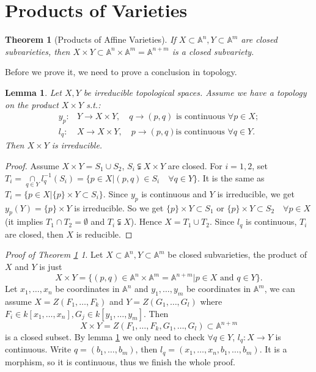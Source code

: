 \documentclass{amsart}
\theoremstyle{plain}
\newtheorem{theorem}{Theorem}
\newtheorem{lemma}{Lemma}
\theoremstyle{definition}
\theoremstyle{remark}
\newtheorem*{proofofproductsofaffinevarieties}{Proof of Theorem \ref{15}}
\numberwithin{equation}{section}
\begin{document}
 \section{Products of Varieties}
\begin{theorem}[Products of Affine Varieties]\label{15}
	If $ X\subset \mathbb{A}^n,Y\subset \mathbb{A}^m $ are closed subvarieties, then $ X\times Y\subset \mathbb{A}^n\times \mathbb{A}^m=\mathbb{A}^{n+m} $ is a closed subvariety.
\end{theorem}
Before we prove it, we need to prove a conclusion in topology.
\begin{lemma}\label{16}
	Let $ X,Y $ be irreducible topological spaces. Assume we have a topology on the product $ X\times Y $ s.t.:
	\begin{align*}
		y_p: & Y\to X\times Y, \quad q\to (p,q) \text{ is continuous }\forall p\in X;\\
		l_q: & X\to X\times Y, \quad p\to (p,q) \text{is continuous }\forall q\in Y.
	\end{align*}
	Then $ X\times Y $ is irreducible.
\end{lemma}
\begin{proof}
	Assume $ X\times Y=S_1\cup S_2 $, $ S_i\subsetneqq X\times Y $ are closed. For $ i=1,2 $, set $ T_i=\mathop{\cap}\limits_{q\in Y}l_q^{-1}(S_i)=\{ p\in X|(p,q)\in S_i \quad\forall q\in Y \} $. It is the same as $ T_i=\{ p\in X|\{ p \}\times Y\subset S_i \} $. Since $ y_p $ is continuous and $ Y $ is irreducible, we get $ y_p(Y)=\{p\}\times Y $ is irreducible. So we get $ \{p\}\times Y\subset S_1 $ or $ \{p\}\times Y\subset S_2 \quad\forall p\in X$(it implies $ T_1\cap T_2=\emptyset $ and $ T_i\subsetneqq X $). Hence $ X=T_1\cup T_2 $. Since $ l_q $ is continuous, $ T_i $ are closed, then $ X $ is reducible.
\end{proof}
\begin{proofofproductsofaffinevarieties}
	Let $ X\subset \mathbb{A}^n,Y\subset \mathbb{A}^m $ be closed subvarieties, the product of $ X $ and $ Y $ is just 
	\begin{equation*}
		X\times Y=\{ (p,q)\in \mathbb{A}^n\times \mathbb{A}^m=\mathbb{A}^{n+m}|p\in X \text{ and }q\in Y \}.
	\end{equation*}
	Let $ x_1,\dots,x_n $ be coordinates in $ \mathbb{A}^n $ and $ y_1,\dots,y_m $ be coordinates in $ \mathbb{A}^m $, we can assume $ X=Z(F_1,\dots,F_k) $ and $ Y=Z(G_1,\dots,G_l) $ where $ F_i\in k[x_1,\dots,x_n],G_j\in k[y_1,\dots,y_m] $. Then 
	\begin{equation}
	X\times Y= Z(F_1,\dots,F_k,G_1,\dots,G_l)\subset \mathbb{A}^{n+m}
	\end{equation}
	is a closed subset. By lemma \ref{16} we only need to check  $\forall  q\in Y $, $ l_q:X\to Y $ is continuous. Write $ q=(b_1,\dots,b_m) $, then $ l_q=(x_1,\dots,x_n,b_1,\dots,b_m) $. It is a morphism, so it is continuous, thus we finish the whole proof.
\end{proofofproductsofaffinevarieties}
\end{document}
